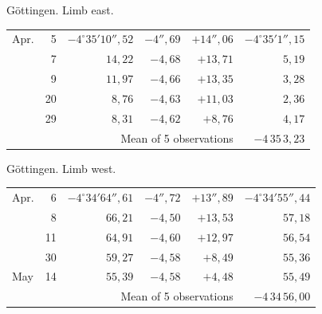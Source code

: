 \noindent\begin{minipage}[t]{.495\textwidth}\centering Göttingen. Limb east.\par\smallskip
{\scriptsize\setlength{\tabcolsep}{1pt}\renewcommand{\arraystretch}{1.2}\begin{tabular}{lr|r|r|r|r|}
Apr.&5&$-4^\circ35'10''{,}52$&$-4''{,}69$&$+14''{,}06$&$-4^\circ35'1''{,}15$\\
&7&$14{,}22$&$-4{,}68$&$+13{,}71$&$5{,}19$\\
&9&$11{,}97$&$-4{,}66$&$+13{,}35$&$3{,}28$\\
&20&$8{,}76$&$-4{,}63$&$+11{,}03$&$2{,}36$\\
&29&$8{,}31$&$-4{,}62$&$+8{,}76$&$4{,}17$\\
\cline{6-6}\multicolumn{5}{r}{Mean of 5 observations}&$-4\,35\,3{,}23$
\end{tabular}}\end{minipage}\hfill\begin{minipage}[t]{.495\textwidth}\centering Göttingen. Limb west.\par\smallskip
{\scriptsize\setlength{\tabcolsep}{1pt}\renewcommand{\arraystretch}{1.2}\begin{tabular}{lr|r|r|r|r}
Apr.&6&$-4^\circ34'64''{,}61$&$-4''{,}72$&$+13''{,}89$&$-4^\circ34'55''{,}44$\\
&8&$66{,}21$&$-4{,}50$&$+13{,}53$&$57{,}18$\\
&11&$64{,}91$&$-4{,}60$&$+12{,}97$&$56{,}54$\\
&30&$59{,}27$&$-4{,}58$&$+8{,}49$&$55{,}36$\\
May&14&$55{,}39$&$-4{,}58$&$+4{,}48$&$55{,}49$\\
\cline{6-6}\multicolumn{5}{r}{Mean of 5 observations}&$-4\,34\,56{,}00$
\end{tabular}}\end{minipage}
\par\vspace{4mm}

